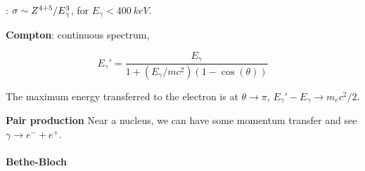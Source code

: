 \documentclass[main.tex]{subfiles}
\begin{document}
: \(\sigma \sim Z^{4 \divisionsymbol 5} / E_\gamma^3\), for \(E _ \gamma < \SI{400}{keV} \).

\textbf{Compton}: continuous spectrum,

\begin{equation}
    E _ \gamma '  = \frac{E_ \gamma}{1 + (E_\gamma / mc^2) (1- \cos(\theta))}
\end{equation}

The maximum energy transferred to the electron is at \(\theta \rightarrow \pi\), \(E_ \gamma ' - E_ \gamma \rightarrow m_e c^2/2\).

\textbf{Pair production} Near a nucleus, we can have some momentum transfer and see \(\gamma \rightarrow
e^- + e^+\).

\paragraph{Bethe-Bloch}
\end{document}
